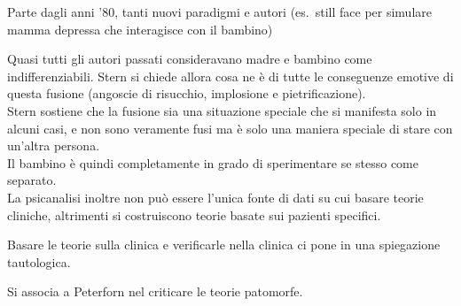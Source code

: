 \documentclass[12pt, a4paper]{article}
\begin{document}
Parte dagli anni '80, tanti nuovi paradigmi e autori (es.\ still face per simulare mamma depressa che interagisce con il bambino)

Quasi tutti gli autori passati consideravano madre e bambino come indifferenziabili. Stern si chiede allora cosa ne è di tutte le conseguenze emotive di questa fusione (angoscie di risucchio, implosione e pietrificazione).
\medskip\\ 
Stern sostiene che la fusione sia una situazione speciale che si manifesta solo in alcuni casi, e non sono veramente fusi ma è solo una maniera speciale di stare con un'altra persona.
\medskip\\ 
Il bambino è quindi completamente in grado di sperimentare se stesso come separato.
\medskip\\ 
La psicanalisi inoltre non può essere l'unica fonte di dati su cui basare teorie cliniche, altrimenti si costruiscono teorie basate sui pazienti specifici.

Basare le teorie sulla clinica e verificarle nella clinica ci pone in una spiegazione tautologica.

Si associa a Peterforn nel criticare le teorie patomorfe.
\end{document}
